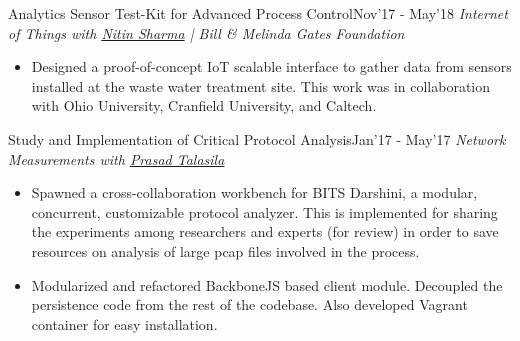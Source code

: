 \begin{projects}
     \project
	{Analytics Sensor Test-Kit for Advanced Process Control}{Nov'17 - May'18}
	{\textit{Internet of Things with \href{http://universe.bits-pilani.ac.in/goa/nitinn/profile}{Nitin Sharma} | Bill \& Melinda Gates Foundation}}
	{\begin{itemize}
     \item Designed a proof-of-concept IoT scalable interface to gather data from sensors installed at the waste water treatment site. This work was in collaboration with Ohio University, Cranfield University, and Caltech.
     \end{itemize}}
    \project
	{Study and Implementation of Critical Protocol Analysis}{Jan'17 - May'17}
	{\textit{Network Measurements with \href{https://prasadtalasila.wordpress.com/}{Prasad Talasila}}}
	{\begin{itemize}
     \item Spawned a cross-collaboration workbench for BITS Darshini, a modular, concurrent, customizable protocol analyzer. This is implemented for sharing the experiments among researchers and experts (for review) in order to save resources on analysis of large pcap files involved in the process.
     \item Modularized and refactored BackboneJS based client module. Decoupled the persistence code from the rest of the codebase. Also developed Vagrant container for easy installation.
     \end{itemize}}
     

\end{projects}

